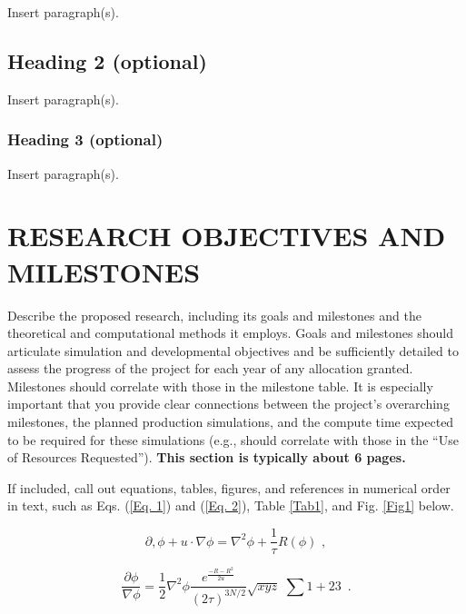 \documentclass[11pt,letterpaper,english]{article}
\begin{document}
Insert paragraph(s).
\vspace{-.25in}
\subsection{Heading 2 (optional)}
\vspace{-.2in}

Insert paragraph(s).

\vspace{-.25in}
\subsubsection{Heading 3 (optional)}
\vspace{-.2in}

Insert paragraph(s).

\vspace{-.25in}
\section{RESEARCH OBJECTIVES AND MILESTONES }  
\vspace{-.2in}
Describe the proposed research, including its goals and milestones and the theoretical and computational methods it employs. Goals and milestones should articulate simulation and developmental objectives and be sufficiently detailed to assess the progress of the project for each year of any allocation granted. Milestones should correlate with those in the milestone table. It is especially important that you provide clear connections between the project's overarching milestones, the planned production simulations, and the compute time expected to be required for these simulations (e.g., should correlate with those in the ``Use of Resources Requested''). {\bf This section is typically about 6 pages.}

If included, call out equations, tables, figures, and references in numerical order in text, such as Eqs. (\ref{Eq. 1}) and (\ref{Eq. 2}), Table \ref{Tab1}, and Fig. \ref{Fig1} below.

\vspace{-.15in}
\begin{equation} \label{Eq. 1} 
\partial ,\phi +u\cdot \nabla \phi =\nabla ^{2} \phi +\frac{1}{\tau } R\left(\phi \right)\, \, ,
\end{equation} 

\vspace{-.15in}
\begin{equation} \label{Eq. 2} 
\frac{\partial \phi }{\nabla \phi } =\frac{1}{2} \nabla ^{2} \phi \frac{e^{\frac{-R-R^{2} }{2u} } }{\left(2\tau \right)^{3N/2} } \sqrt{xyz} \, \, \sum 1+23\, \, \, . 
\end{equation} 
\end{document}
